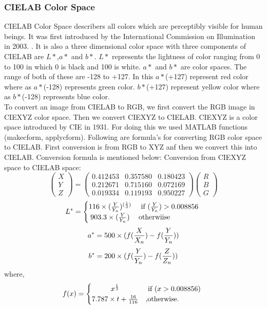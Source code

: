 \subsubsection*{CIELAB Color Space}
CIELAB Color Space describers all colors which are perceptibly visible for human beings. It was first introduced by the International Commission on Illumination in 2003. \cite{CIELAB}. It is also a three dimensional color space with three components of CIELAB are $L*$,$ a*$ and $b*$. $L*$ represents the lightness of color ranging from 0 to 100 in which 0 is black and 100 is white. $a*$ and $b*$ are color spaces. The range of both of these are -128 to +127. In this $a*$(+127) represent red color where as $a*$(-128) represents green color. $b*$(+127) represent yellow color where as $b*$(-128) represents blue color. \\
	To convert an image from CIELAB to RGB, we first convert the RGB image in CIEXYZ color space. Then we convert CIEXYZ to CIELAB. CIEXYZ is a color space introduced by CIE in 1931. For doing this we used MATLAB functions (makecform, applycform).
	Following are formula's for converting RGB color space to CIELAB. First conversion is from RGB to XYZ anf then we convert this into CIELAB. Conversion formula is mentioned below:
	Conversion from CIEXYZ space to CIELAB space:
		 $$ \left( \begin{array}{c} X \\ Y \\ Z \end{array} \right) =  \left( \begin{array}{ccc} 0.412453 & 0.357580 & 0.180423 \\ 0.212671 & 0.715160 & 0.072169 \\ 0.019334 & 0.119193 & 0.950227 \end{array} \right) \left( \begin{array}{c} R \\ B \\ G \end{array} \right)$$
		 \[
L^{*} =
  \begin{cases} 
      \hfill 116 \times (\frac{Y}{Y_n})^{({\frac{1}{3}})}    \hfill & \text{ if $(\frac{Y}{Y_n}) > 0.008856$ } \\
      \hfill 903.3 \times (\frac{Y}{Y_n}) \hfill & \text{otherwiise} \\
  \end{cases}
\]
 \[  a^* = 500 \times (f(\frac{X}{X_n})-f(\frac{Y}{Y_n})) \\ \]
   \[  b^* = 200 \times (f(\frac{Y}{Y_n})-f(\frac{Z}{Z_n}))\\ \]
 where,
  \[
  f(x)=
   \begin{cases} 
   \hfill x^{\frac{1}{3}} \hfill & \text{ if $( x > 0.008856)$ } \\
   \hfill 7.787 \times t + \frac{16}{116} \hfill & \text{,otherwise.} \\
   \end{cases}
  \]
 

